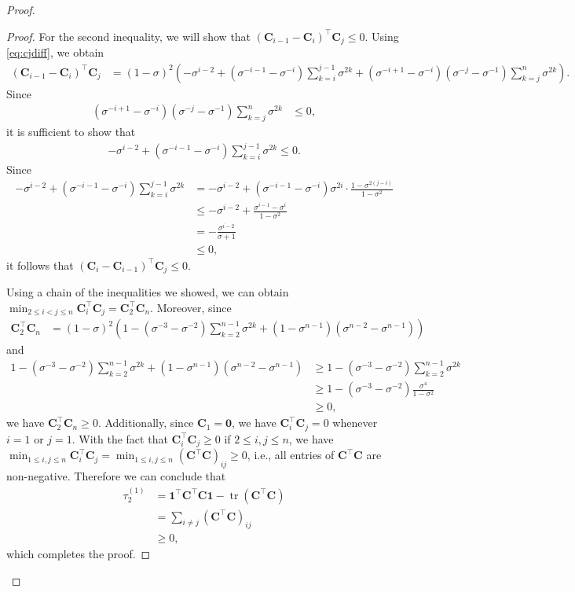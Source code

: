 \documentclass{article}
\theoremstyle{plain}
\theoremstyle{definition}
\theoremstyle{remark}
\def\bigopen#1{\left(#1\right)}
\def\vzero{{\bm{0}}}
\def\vone{{\bm{1}}}
\def\mC{{\bm{C}}}
\DeclareMathOperator{\tr}{tr}
\begin{document}
\begin{proof}
\begin{proof}
    For the second inequality, we will show that $(\mC_{i-1}-\mC_i)^{\top} \mC_j \le 0$. Using \cref{eq:cjdiff}, we obtain
    \begin{align*}
        (\mC_{i-1}-\mC_i)^{\top} \mC_j &= (1-\sigma)^2 \bigopen{-\sigma^{i-2} + (\sigma^{-i-1}-\sigma^{-i})\sum_{k=i}^{j-1} \sigma^{2k} + (\sigma^{-i+1}-\sigma^{-i})(\sigma^{-j}-\sigma^{-1})\sum_{k=j}^n \sigma^{2k}}.
    \end{align*}
    Since 
    \begin{align*}
         (\sigma^{-i+1}-\sigma^{-i})(\sigma^{-j}-\sigma^{-1})\sum_{k=j}^n \sigma^{2k} &\le 0,
    \end{align*}
    it is sufficient to show that 
    \begin{align*}
        -\sigma^{i-2} + (\sigma^{-i-1}-\sigma^{-i})\sum_{k=i}^{j-1} \sigma^{2k} \le 0.
    \end{align*}
    Since
    \begin{align*}
        -\sigma^{i-2} + (\sigma^{-i-1}-\sigma^{-i})\sum_{k=i}^{j-1} \sigma^{2k} &= -\sigma^{i-2} + (\sigma^{-i-1}-\sigma^{-i}) \sigma^{2i} \cdot \frac{1-\sigma^{2(j-i)}}{1-\sigma^2} \\
        &\le -\sigma^{i-2} + \frac{\sigma^{i-1}-\sigma^i}{1-\sigma^2}\\
        &= -\frac{\sigma^{i-2}}{\sigma+1} \\
        &\le 0,
    \end{align*}
    it follows that $(\mC_i-\mC_{i-1})^{\top} \mC_j \le 0$.

    Using a chain of the inequalities we showed, we can obtain $\min_{2\le i<j\le n} \mC_i^{\top} \mC_j = \mC_2^{\top} \mC_n$.
    Moreover, since 
    \begin{align*}
        \mC_2^{\top} \mC_n &= (1-\sigma)^2 \bigopen{1 - (\sigma^{-3}-\sigma^{-2})\sum_{k=2}^{n-1}\sigma^{2k} + (1-\sigma^{n-1})(\sigma^{n-2}-\sigma^{n-1})}
    \end{align*}
    and 
    \begin{align*}
        1 - (\sigma^{-3}-\sigma^{-2})\sum_{k=2}^{n-1}\sigma^{2k} + (1-\sigma^{n-1})(\sigma^{n-2}-\sigma^{n-1}) &\ge 1 - (\sigma^{-3}-\sigma^{-2})\sum_{k=2}^{n-1}\sigma^{2k}\\
        &\ge 1 - (\sigma^{-3}-\sigma^{-2})\frac{\sigma^4}{1-\sigma^2}\\
        &\ge 0,
    \end{align*}
    we have $\mC_2^{\top} \mC_n \ge 0$. Additionally, since $\mC_1 = \vzero$, we have $\mC_i^{\top} \mC_j = 0$ whenever $i = 1$ or $j = 1$.
    With the fact that $\mC_i^{\top} \mC_j \ge 0$ if $2 \le i, j \le n$, we have $\min_{1\le i,j \le n} \mC_i^{\top} \mC_j = \min_{1\le i,j \le n} (\mC^{\top} \mC)_{ij} \ge 0$, i.e., all entries of $\mC^{\top} \mC$ are non-negative.
    Therefore we can conclude that
    \begin{align*}
        \tau_2^{(1)} &= \vone^{\top} \mC^{\top} \mC \vone - \tr (\mC^{\top} \mC)\\
        &= \sum_{i\ne j} (\mC^{\top} \mC)_{ij}\\
        &\ge 0,
    \end{align*}
    which completes the proof.
\end{proof}


\end{proof}
\end{document}
